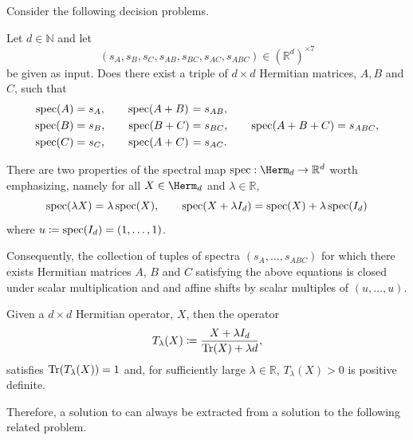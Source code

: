 \documentclass[notitlepage]{article}
\begin{document}
Consider the following decision problems.
\begin{prob}
    \label{prob:thp}
    Let $d \in \mathbb N$ and let 
    \begin{equation}
        (s_{A}, s_{B}, s_{C}, s_{AB}, s_{BC}, s_{AC}, s_{ABC}) \in (\mathbb R^{d})^{\times 7}
    \end{equation}
    be given as input.
    Does there exist a triple of $d\times d$ Hermitian matrices, $A,B$ and $C$, such that
    \begin{equation}
        \begin{alignedat}{2}
            \operatorname{spec}(A) &= s_{A}, \qquad \operatorname{spec}(A+B) &&= s_{AB}, \\
            \operatorname{spec}(B) &= s_{B}, \qquad \operatorname{spec}(B+C) &&= s_{BC}, \qquad \operatorname{spec}(A+B+C) = s_{ABC}, \\
            \operatorname{spec}(C) &= s_{C}, \qquad \operatorname{spec}(A+C) &&= s_{AC}.
        \end{alignedat}
    \end{equation}
\end{prob}

There are two properties of the spectral map $\spec : \Herm_{d} \to \mathbb R^{d}$ worth emphasizing, namely for all $X \in \Herm_{d}$ and $\lambda \in \mathbb R$,
\begin{equation}
    \operatorname{spec}(\lambda X) = \lambda \operatorname{spec}(X), \qquad \operatorname{spec}(X + \lambda I_{d}) = \operatorname{spec}(X) + \lambda \operatorname{spec}(I_d)
\end{equation}
where $u \coloneqq \operatorname{spec}(I_d) = (1, \ldots, 1)$.

Consequently, the collection of tuples of spectra $(s_{A}, \ldots, s_{ABC})$ for which there exists Hermitian matrices $A$, $B$ and $C$ satisfying the above equations is closed under scalar multiplication and and affine shifts by scalar multiples of $(u, \ldots, u)$.
\begin{lem}
    \label{lem:shifting_scaling}
    Given a $d\times d$ Hermitian operator, $X$, then the operator
    \begin{equation}
        T_{\lambda}(X) \coloneqq \frac{X + \lambda I_d}{\operatorname{Tr}(X) + \lambda d},
    \end{equation}
    satisfies $\operatorname{Tr}(T_{\lambda}(X)) = 1$ and, for sufficiently large $\lambda \in \mathbb R$, $T_{\lambda}(X) > 0$ is positive definite.
\end{lem}

Therefore, a solution to  can always be extracted from a solution to the following related problem.
\end{document}
